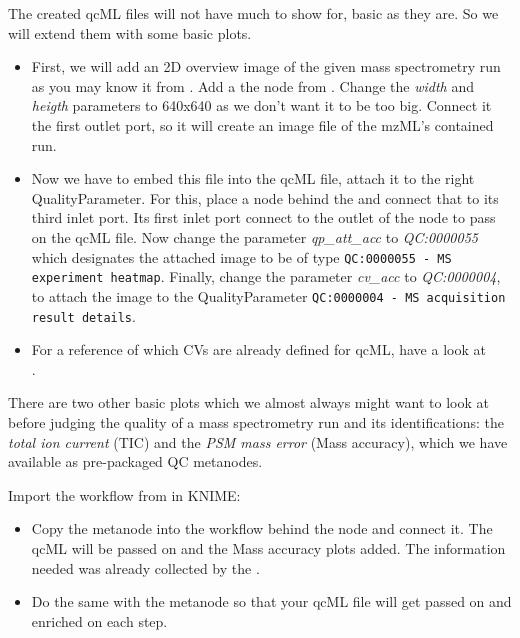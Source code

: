 The created qcML files will not have much to show for, basic as they are. So we will extend them with some basic plots.
\begin{itemize}
\item First, we will add an 2D overview image of the given mass spectrometry run as you may know it from . Add a the  node from . Change the \textit{width} and \textit{heigth} parameters to 640x640 as we don't want it to be too big. Connect it the first  outlet port, so it will create an image file of the mzML's contained run.
\item Now we have to embed this file into the qcML file, attach it to the right QualityParameter. For this, place a  node behind the  and connect that to its third inlet port. Its first inlet port connect to the outlet of the  node to pass on the qcML file. Now change the parameter \textit{qp\_att\_acc} to \textit{QC:0000055} which designates the attached image to be of type  \texttt{QC:0000055 - MS experiment heatmap}.
Finally, change the parameter \textit{cv\_acc} to \textit{QC:0000004}, to attach the image to the QualityParameter \texttt{QC:0000004 - MS acquisition result details}.
\item For a reference of which CVs are already defined for qcML, have a look at \\ .
\end{itemize}

There are two other basic plots which we almost always might want to look at before judging the quality of a mass spectrometry run and its identifications: the \textit{total ion current} (TIC) and the \textit{PSM mass error} (Mass accuracy), which we have available as pre-packaged QC metanodes.
\begin{task}
Import the workflow from  in KNIME: 
\end{task}
\begin{itemize}
\item Copy the  metanode into the workflow behind the  node and connect it. The qcML will be passed on and the Mass accuracy plots added. The information needed was already collected by the .
\item Do the same with the  metanode so that your qcML file will get passed on and enriched on each step. 
\end{itemize}

